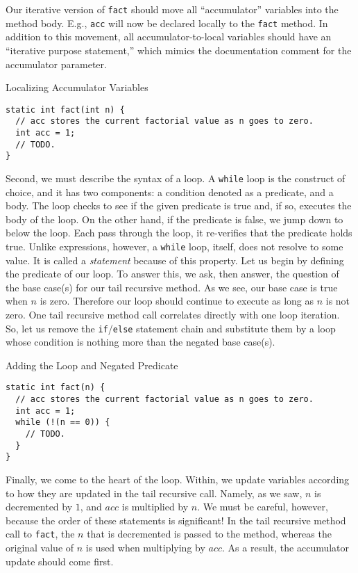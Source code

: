 Our iterative version of \texttt{fact} should move all ``accumulator'' variables into the method body. E.g., \texttt{acc} will now be declared locally to the \texttt{fact} method. In addition to this movement, all accumulator-to-local variables should have an ``iterative purpose statement,'' which mimics the documentation comment for the accumulator parameter.

\begin{cl}[]{Localizing Accumulator Variables}
\begin{lstlisting}[language=MyJava]
static int fact(int n) {
  // acc stores the current factorial value as n goes to zero.
  int acc = 1;
  // TODO.
}
\end{lstlisting}
\end{cl}

Second, we must describe the syntax of a loop. A \texttt{while} loop is the construct of choice, and it has two components: a condition denoted as a predicate, and a body. The loop checks to see if the given predicate is true and, if so, executes the body of the loop. On the other hand, if the predicate is false, we jump down to below the loop. Each pass through the loop, it re-verifies that the predicate holds true. Unlike expressions, however, a \texttt{while} loop, itself, does not resolve to some value. It is called a \textit{statement} because of this property. Let us begin by defining the predicate of our loop. To answer this, we ask, then answer, the question of the base case(s) for our tail recursive method. As we see, our base case is true when $n$ is zero. Therefore our loop should continue to execute as long as $n$ is not zero. One tail recursive method call correlates directly with one loop iteration. So, let us remove the \texttt{if}/\texttt{else} statement chain and substitute them by a loop whose condition is nothing more than the negated base case(s).

\begin{cl}[]{Adding the Loop and Negated Predicate}
\begin{lstlisting}[language=MyJava]
static int fact(n) {
  // acc stores the current factorial value as n goes to zero.
  int acc = 1;
  while (!(n == 0)) {
    // TODO.
  }
}
\end{lstlisting}
\end{cl}

Finally, we come to the heart of the loop. Within, we update variables according to how they are updated in the tail recursive call. Namely, as we saw, $n$ is decremented by $1$, and $\textit{acc}$ is multiplied by $n$. We must be careful, however, because the order of these statements is significant! In the tail recursive method call to \texttt{fact}, the $n$ that is decremented is passed to the method, whereas the original value of $n$ is used when multiplying by $\textit{acc}$. As a result, the accumulator update should come first.

